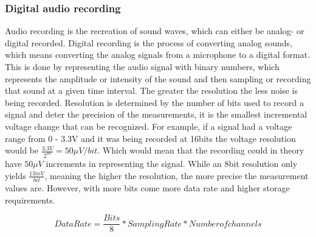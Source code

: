 \subsubsection{Digital audio recording}\label{sec:DigitalAudiRec}


Audio recording is the recreation of sound waves, which can either be analog- or digital recorded.
Digital recording is the process of converting analog sounds, which means converting the analog signals from a microphone to a digital format. 
This is done by representing the audio signal with binary numbers, which represents the amplitude or intensity of the sound and then sampling or recording that sound at a given time interval.
The greater the resolution the less noise is being recorded.
Resolution is determined by the number of bits used to record a signal and deter the precision of the measurements, it is the smallest incremental voltage change that can be recognized.
For example, if a signal had a voltage range from 0 - 3.3V and it was being recorded at 16bits the voltage resolution would be $\frac{3.3V}{2^{16}} = 50\mu V/bit$.
Which would mean that the recording could in theory have $50\mu V$ increments in representing the signal.  
While an 8bit resolution only yields $\frac{13mV}{bit}$, meaning the higher the resolution, the more precise the measurement values are.
However, with more bits come more data rate and higher storage requirements.

\begin{equation}
    Data Rate = \frac{Bits}{8} * Sampling Rate * Number of channels 
    \label{eq:dataRate}
\end{equation}


